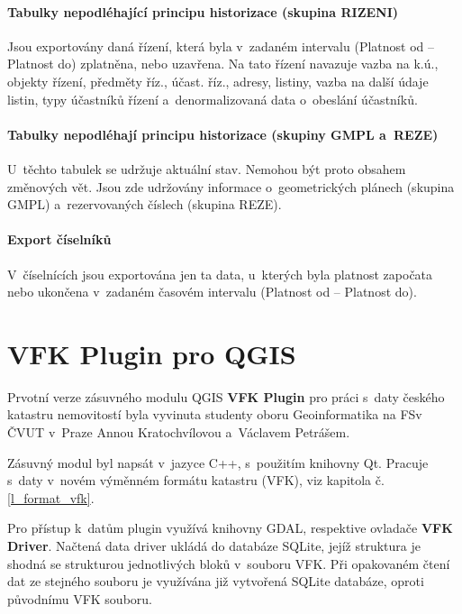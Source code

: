 \documentclass[a4paper,12pt,oneside]{book}
\begin{document}
\subsubsection{Tabulky nepodléhající principu historizace (skupina RIZENI)}

Jsou exportovány daná řízení, která byla v~zadaném intervalu (Platnost od -- Platnost do) zplatněna, nebo uzavřena. Na tato řízení navazuje vazba na k.ú., objekty řízení, předměty říz., účast. říz., adresy, listiny, vazba na další údaje listin, typy účastníků řízení a~denormalizovaná data o~obeslání účastníků. \cite{vfk_struktura}

\subsubsection{Tabulky nepodléhají principu historizace (skupiny GMPL a~REZE)}

U~těchto tabulek se udržuje aktuální stav. Nemohou být proto obsahem změnových vět. Jsou zde udržovány informace o~geometrických plánech (skupina GMPL) a~rezervovaných číslech (skupina REZE). \cite{vfk_struktura}

\subsubsection{Export číselníků}

V~číselnících jsou exportována jen ta data, u~kterých byla platnost započata nebo ukončena v~zadaném časovém intervalu (Platnost od -- Platnost do). \cite{vfk_struktura}


\clearpage
\chapter{VFK Plugin pro QGIS}
Prvotní verze zásuvného modulu QGIS \textbf{VFK Plugin} pro práci s~daty českého katastru nemovitostí byla vyvinuta studenty oboru Geoinformatika na FSv ČVUT v~Praze Annou Kratochvílovou a~Václavem Petrášem. 

Zásuvný modul byl napsát v~jazyce C++, s~použitím knihovny Qt. Pracuje s~daty v~novém výměnném formátu katastru (VFK), viz kapitola č. \ref{l_format_vfk}. 

Pro přístup k~datům plugin využívá knihovny GDAL, respektive ovladače \textbf{VFK Driver}. Načtená data driver ukládá do databáze SQLite, jejíž struktura je shodná se strukturou jednotlivých bloků v~souboru VFK. Při opakovaném čtení dat ze stejného souboru je využívána již vytvořená SQLite databáze, oproti původnímu VFK souboru. 
\end{document}
